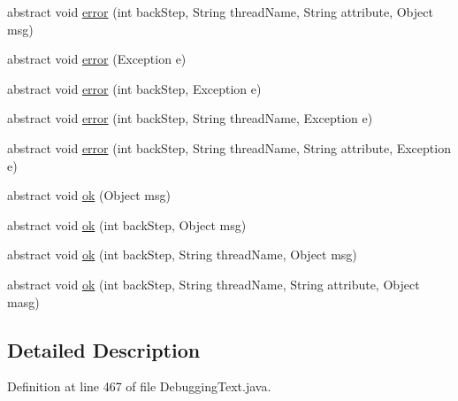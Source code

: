 \begin{DoxyCompactItemize}
\item 
abstract void \hyperlink{classit_1_1emarolab_1_1cagg_1_1debugging_1_1DebuggingText_1_1LoggerBase_a70f226d0758c85631b7c444433a1791e}{error} (int back\-Step, String thread\-Name, String attribute, Object msg)
\item 
abstract void \hyperlink{classit_1_1emarolab_1_1cagg_1_1debugging_1_1DebuggingText_1_1LoggerBase_a4d9c52f6204c3d1772082d17b6b149a2}{error} (Exception e)
\item 
abstract void \hyperlink{classit_1_1emarolab_1_1cagg_1_1debugging_1_1DebuggingText_1_1LoggerBase_a92a930cc27f0dd06136cd503e0cb8e9a}{error} (int back\-Step, Exception e)
\item 
abstract void \hyperlink{classit_1_1emarolab_1_1cagg_1_1debugging_1_1DebuggingText_1_1LoggerBase_ac49f5ade05d1482b5fa13c09c4e5b699}{error} (int back\-Step, String thread\-Name, Exception e)
\item 
abstract void \hyperlink{classit_1_1emarolab_1_1cagg_1_1debugging_1_1DebuggingText_1_1LoggerBase_a3778bff31339f5e0c4ab0bfd58feca63}{error} (int back\-Step, String thread\-Name, String attribute, Exception e)
\item 
abstract void \hyperlink{classit_1_1emarolab_1_1cagg_1_1debugging_1_1DebuggingText_1_1LoggerBase_a9d12851adf7c1e3ab75c0af6b2b6fc02}{ok} (Object msg)
\item 
abstract void \hyperlink{classit_1_1emarolab_1_1cagg_1_1debugging_1_1DebuggingText_1_1LoggerBase_a585ed1e196615aed014aeb3c10ac07c1}{ok} (int back\-Step, Object msg)
\item 
abstract void \hyperlink{classit_1_1emarolab_1_1cagg_1_1debugging_1_1DebuggingText_1_1LoggerBase_a968e5208bff20d65f78a3593a486fd11}{ok} (int back\-Step, String thread\-Name, Object msg)
\item 
abstract void \hyperlink{classit_1_1emarolab_1_1cagg_1_1debugging_1_1DebuggingText_1_1LoggerBase_a9ee1f6ddba6080c7594b81db5df99af0}{ok} (int back\-Step, String thread\-Name, String attribute, Object masg)
\end{DoxyCompactItemize}


\subsection{Detailed Description}


Definition at line 467 of file Debugging\-Text.\-java.



